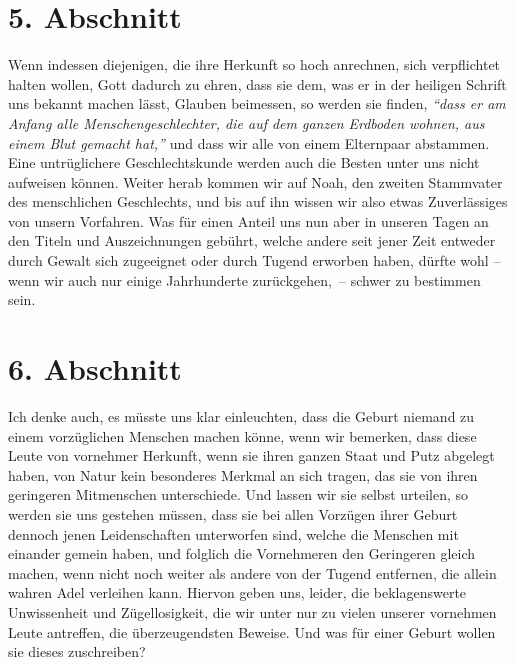 \section{5. Abschnitt} \label{kap11_ab5}

Wenn indessen diejenigen, die ihre Herkunft so hoch anrechnen, sich verpflichtet
halten wollen, Gott dadurch zu ehren, dass sie dem, was er in der heiligen
Schrift uns bekannt machen lässt, Glauben beimessen, so werden sie finden,
\textit{"`dass
er am Anfang alle Menschengeschlechter, die auf dem ganzen Erdboden wohnen,
aus einem Blut gemacht hat,"'}
und dass wir alle
von einem Elternpaar abstammen. Eine untrüglichere Geschlechtskunde werden auch
die Besten unter uns nicht aufweisen können. Weiter herab kommen wir auf
Noah, den zweiten Stammvater des menschlichen Geschlechts,
und bis auf ihn
wissen wir also etwas Zuverlässiges von unsern Vorfahren. Was für einen Anteil
uns nun aber in unseren Tagen an den Titeln und Auszeichnungen gebührt, welche
andere seit jener Zeit entweder durch Gewalt sich zugeeignet oder
durch Tugend
erworben haben, dürfte wohl -- wenn wir auch nur einige Jahrhunderte
zurückgehen,~-- schwer zu bestimmen sein.

\section{6. Abschnitt} \label{kap11_ab6}

Ich denke auch, es
müsste uns klar einleuchten, dass die Geburt niemand zu einem
vorzüglichen Menschen machen könne, wenn wir bemerken, dass diese Leute von
vornehmer Herkunft, wenn sie ihren ganzen Staat und Putz abgelegt haben, von
Natur kein besonderes Merkmal an sich tragen, das sie von ihren geringeren
Mitmenschen unterschiede. Und lassen wir sie selbst urteilen, so werden sie
uns gestehen müssen, dass sie bei allen Vorzügen ihrer Geburt dennoch jenen
Leidenschaften unterworfen sind, welche die Menschen mit
einander gemein haben,
und folglich die Vornehmeren den Geringeren gleich machen, wenn nicht noch
weiter
als andere von der Tugend entfernen, die allein wahren Adel verleihen kann.
Hiervon geben uns, leider, die beklagenswerte Unwissenheit und Zügellosigkeit,
die wir unter nur zu vielen unserer vornehmen Leute antreffen, die
überzeugendsten Beweise. Und was für einer Geburt wollen sie dieses zuschreiben?

